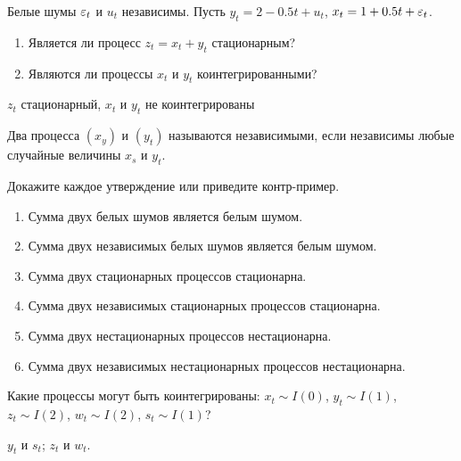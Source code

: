 \begin{problem}
Белые шумы $\varepsilon_t$ и $u_t$ независимы. Пусть $y_t=2-0.5t+u_t$, $x_t=1+0.5t+\varepsilon_t$.
\begin{enumerate}
\item Является ли процесс $z_t=x_t+y_t$ стационарным?
\item Являются ли процессы $x_t$ и $y_t$ коинтегрированными?
\end{enumerate}
\begin{sol}

$z_t$ стационарный, $x_t$ и $y_t$ не коинтегрированы
\end{sol}
\end{problem}


\begin{problem}
Два процесса $(x_y)$ и $(y_t)$ называются независимыми, если независимы любые случайные величины $x_s$ и $y_t$.

Докажите каждое утверждение или приведите контр-пример.
\begin{enumerate}
  \item Сумма двух белых шумов является белым шумом.
  \item Сумма двух независимых белых шумов является белым шумом.
  \item Сумма двух стационарных процессов стационарна.
  \item Сумма двух независимых стационарных процессов стационарна.
  \item Сумма двух нестационарных процессов нестационарна.
  \item Сумма двух независимых нестационарных процессов нестационарна.
\end{enumerate}

\begin{sol}

\end{sol}
\end{problem}

\begin{problem}
Какие процессы могут быть коинтегрированы: $x_t \sim I(0)$, $y_t \sim I(1)$, $z_t \sim I(2)$, $w_t \sim I(2)$, $s_t \sim I(1)$?

\begin{sol}
$y_t$ и $s_t$; $z_t$ и $w_t$.
\end{sol}

\end{problem}


